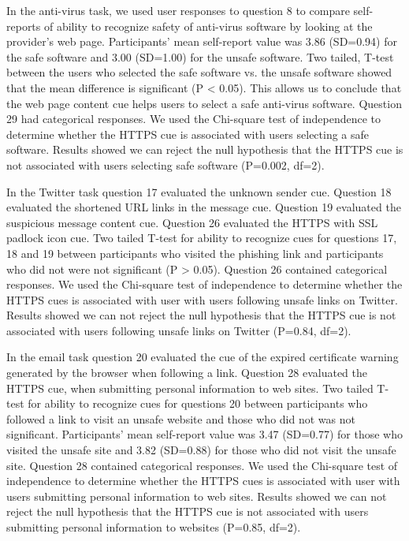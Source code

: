 In the anti-virus task, we used user responses to question 8 to compare self-reports of ability to recognize safety of anti-virus software by looking at the provider's web page. Participants' mean self-report value was 3.86 (SD=0.94) for the safe software and 3.00 (SD=1.00) for the unsafe software. Two tailed, T-test between the users who selected the safe software vs. the unsafe software showed that the mean difference is significant (P < 0.05). This allows us to conclude that the web page content cue helps users to select a safe anti-virus software. Question 29 had categorical responses. We used the Chi-square test of independence to determine whether the HTTPS cue is associated with users selecting a safe software. Results showed we can reject the null hypothesis that the HTTPS cue is not associated with users selecting safe software (P=0.002, df=2).

In the Twitter task question 17 evaluated the unknown sender cue. Question 18 evaluated the shortened URL links in the message cue. Question 19 evaluated the suspicious message content cue. Question 26 evaluated the HTTPS with SSL padlock icon cue. Two tailed T-test for ability to recognize cues for questions 17, 18 and 19 between participants who visited the phishing link and participants who did not were not significant (P > 0.05). Question 26 contained categorical responses. We used the Chi-square test of independence to determine whether the HTTPS cues is associated with user with users following unsafe links on Twitter. Results showed we can not reject the null hypothesis that the HTTPS cue is not associated with users following unsafe links on Twitter (P=0.84, df=2).

In the email task question 20 evaluated the cue of the expired certificate warning generated by the browser when following a link. Question 28 evaluated the HTTPS cue, when submitting personal information to web sites. Two tailed T-test for ability to recognize cues for questions 20 between participants who followed a link to visit an unsafe website and those who did not was not significant. Participants' mean self-report value was 3.47 (SD=0.77) for those who visited the unsafe site and 3.82 (SD=0.88) for those who did not visit the unsafe site. Question 28 contained categorical responses. We used the Chi-square test of independence to determine whether the HTTPS cues is associated with user with users submitting personal information to web sites. Results showed we can not reject the null hypothesis that the HTTPS cue is not associated with users submitting personal information to websites (P=0.85, df=2).


